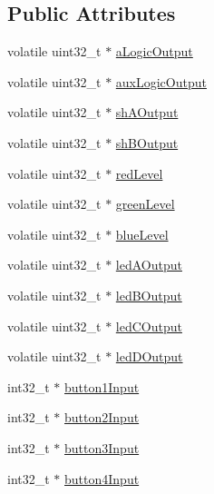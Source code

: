 \subsection*{Public Attributes}
\begin{DoxyCompactItemize}
\item 
volatile uint32\+\_\+t $\ast$ \mbox{\hyperlink{class_via_module_ad4a23778dedad370ff274c8fc4b8f3b7}{a\+Logic\+Output}}
\item 
volatile uint32\+\_\+t $\ast$ \mbox{\hyperlink{class_via_module_a61d2533e5f10aca8d49921ec8d73ac95}{aux\+Logic\+Output}}
\item 
volatile uint32\+\_\+t $\ast$ \mbox{\hyperlink{class_via_module_ae563d7159c4e8ef81ff794883e9ee0a6}{sh\+A\+Output}}
\item 
volatile uint32\+\_\+t $\ast$ \mbox{\hyperlink{class_via_module_a9d6d3dd39cf5560aaf2b14a6d7c4a46b}{sh\+B\+Output}}
\item 
volatile uint32\+\_\+t $\ast$ \mbox{\hyperlink{class_via_module_a3e48bf5daca7c32b045460bb0c5c171c}{red\+Level}}
\item 
volatile uint32\+\_\+t $\ast$ \mbox{\hyperlink{class_via_module_af0465adbc24c831446092ceda3afc7d1}{green\+Level}}
\item 
volatile uint32\+\_\+t $\ast$ \mbox{\hyperlink{class_via_module_a79bfefe99580184e55ef001ca38d62e5}{blue\+Level}}
\item 
volatile uint32\+\_\+t $\ast$ \mbox{\hyperlink{class_via_module_a87b482ee25e03764976b8f179081b383}{led\+A\+Output}}
\item 
volatile uint32\+\_\+t $\ast$ \mbox{\hyperlink{class_via_module_adec17977c61271a9752a3d21ab532d07}{led\+B\+Output}}
\item 
volatile uint32\+\_\+t $\ast$ \mbox{\hyperlink{class_via_module_ac748f5b3fccba0d46153fbe25f0f05f4}{led\+C\+Output}}
\item 
volatile uint32\+\_\+t $\ast$ \mbox{\hyperlink{class_via_module_ac11bc2cd4f35777e6aac585c77eb9103}{led\+D\+Output}}
\item 
int32\+\_\+t $\ast$ \mbox{\hyperlink{class_via_module_ab1d7b6a86009b9371480ecf0a71aa89f}{button1\+Input}}
\item 
int32\+\_\+t $\ast$ \mbox{\hyperlink{class_via_module_ab77ba29dcff12ca1c826769749670d8a}{button2\+Input}}
\item 
int32\+\_\+t $\ast$ \mbox{\hyperlink{class_via_module_afe1c19b148dc4fce5ffb1bcbba3bb1f0}{button3\+Input}}
\item 
int32\+\_\+t $\ast$ \mbox{\hyperlink{class_via_module_acfde15bd4b560f5475804311f8568375}{button4\+Input}}

\end{DoxyCompactItemize}
